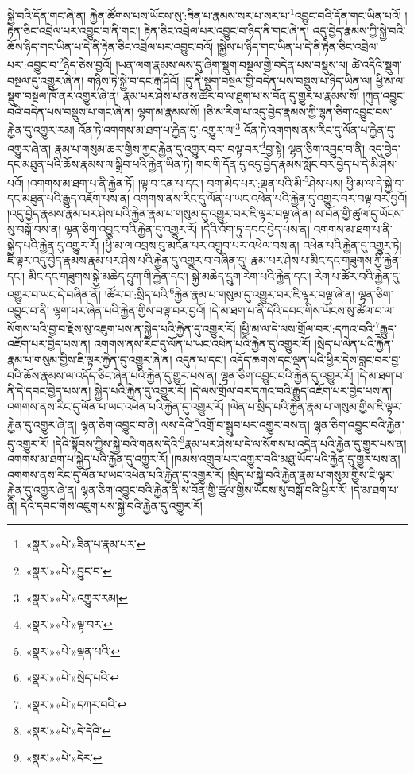 སྐྱེ་བའི་དོན་གང་ཞེ་ན། རྐྱེན་ཚོགས་པས་ཡོངས་སུ་:ཟིན་པ་རྣམས་སར་པ་སར་པ་\footnote{«སྣར་»«པེ་»ཟིན་པ་རྣམ་པར་}འབྱུང་བའི་དོན་གང་ཡིན་པའོ། །རྟེན་ཅིང་འབྲེལ་པར་འབྱུང་བ་ནི་གང་། རྟེན་ཅིང་འབྲེལ་པར་འབྱུང་བ་ཉིད་ནི་གང་ཞེ་ན། འདུ་བྱེད་རྣམས་ཀྱི་སྐྱེ་བའི་ཆོས་ཉིད་གང་ཡིན་པ་དེ་ནི་རྟེན་ཅིང་འབྲེལ་པར་འབྱུང་བའོ། །སྐྱེས་པ་ཉིད་གང་ཡིན་པ་དེ་ནི་རྟེན་ཅིང་འབྲེལ་པར་:འབྱུང་བ་\footnote{«སྣར་»«པེ་»བྱུང་བ་}ཉིད་ཅེས་བྱའོ། །ཡན་ལག་རྣམས་ལས་དུ་ཞིག་སྡུག་བསྔལ་གྱི་བདེན་པས་བསྡུས་ལ། ཚེ་འདིའི་སྡུག་བསྔལ་དུ་འགྱུར་ཞེ་ན། གཉིས་ཏེ་སྐྱེ་བ་དང་རྒ་ཤིའོ། །དུ་ནི་སྡུག་བསྔལ་གྱི་བདེན་པས་བསྡུས་པ་ཉིད་ཡིན་ལ། ཕྱི་མ་ལ་སྡུག་བསྔལ་ཁོ་ནར་འགྱུར་ཞེ་ན། རྣམ་པར་ཤེས་པ་ནས་ཚོར་བ་ལ་ཐུག་པ་ས་བོན་དུ་གྱུར་པ་རྣམས་སོ། །ཀུན་འབྱུང་བའི་བདེན་པས་བསྡུས་པ་གང་ཞེ་ན། ལྷག་མ་རྣམས་སོ། །ཅི་མ་རིག་པ་འདུ་བྱེད་རྣམས་ཀྱི་ལྷན་ཅིག་འབྱུང་བས་རྐྱེན་དུ་འགྱུར་རམ། འོན་ཏེ་འགགས་མ་ཐག་པ་རྐྱེན་དུ་:འགྱུར་ལ།\footnote{«སྣར་»«པེ་»འགྱུར་རམ།} འོན་ཏེ་འགགས་ནས་རིང་དུ་ལོན་པ་རྐྱེན་དུ་འགྱུར་ཞེ་ན། རྣམ་པ་གསུམ་ཆར་གྱིས་ཀྱང་རྐྱེན་དུ་འགྱུར་བར་:བལྟ་བར་\footnote{«སྣར་»«པེ་»ལྟ་བར་}བྱ་སྟེ། ལྷན་ཅིག་འབྱུང་བ་ནི། འདུ་བྱེད་དང་མཐུན་པའི་ཆོས་རྣམས་ལ་སྒྲིབ་པའི་རྐྱེན་ཡིན་ཏེ། གང་གི་དོན་དུ་འདུ་བྱེད་རྣམས་སློང་བར་བྱེད་པ་དེ་མི་ཤེས་པའོ། །འགགས་མ་ཐག་པ་ནི་རྐྱེན་ཏོ། །ལྟ་བ་ངན་པ་དང་། བག་མེད་པར་:ལྡན་པའི་མི་\footnote{«སྣར་»«པེ་»ལྡན་པའི་}ཤེས་པས། ཕྱི་མ་ལ་དེ་སྐྱེ་བ་དང་མཐུན་པའི་རྒྱུད་འཇོག་པས་ན། འགགས་ནས་རིང་དུ་ལོན་པ་ཡང་འཕེན་པའི་རྐྱེན་དུ་འགྱུར་བར་བལྟ་བར་བྱའོ། །འདུ་བྱེད་རྣམས་རྣམ་པར་ཤེས་པའི་རྐྱེན་རྣམ་པ་གསུམ་དུ་འགྱུར་བར་ཇི་ལྟར་བལྟ་ཞེ་ན། ས་བོན་གྱི་ཚུལ་དུ་ཡོངས་སུ་བསྒོ་བས་ན། ལྷན་ཅིག་འབྱུང་བའི་རྐྱེན་དུ་འགྱུར་རོ། །དེའི་འོག་ཏུ་དབང་བྱེད་པས་ན། འགགས་མ་ཐག་པ་ནི་སྐྱེད་པའི་རྐྱེན་དུ་འགྱུར་རོ། །ཕྱི་མ་ལ་འབྲས་བུ་མངོན་པར་འགྲུབ་པར་འཕེལ་བས་ན། འཕེན་པའི་རྐྱེན་དུ་འགྱུར་ཏེ། ཇི་ལྟར་འདུ་བྱེད་རྣམས་རྣམ་པར་ཤེས་པའི་རྐྱེན་དུ་འགྱུར་བ་བཞིན་དུ། རྣམ་པར་ཤེས་པ་མིང་དང་གཟུགས་ཀྱི་རྐྱེན་དང་། མིང་དང་གཟུགས་སྐྱེ་མཆེད་དྲུག་གི་རྐྱེན་དང་། སྐྱེ་མཆེད་དྲུག་རེག་པའི་རྐྱེན་དང་། རེག་པ་ཚོར་བའི་རྐྱེན་དུ་འགྱུར་བ་ཡང་དེ་བཞིན་ནོ། །ཚོར་བ་:སྲིད་པའི་\footnote{«སྣར་»«པེ་»སྲེད་པའི་}རྐྱེན་རྣམ་པ་གསུམ་དུ་འགྱུར་བར་ཇི་ལྟར་བལྟ་ཞེ་ན། ལྷན་ཅིག་འབྱུང་བ་ནི། ལྷག་པར་ཞེན་པའི་རྐྱེན་གྱིས་བལྟ་བར་བྱའོ། །དེ་མ་ཐག་པ་ནི་དེའི་དབང་གིས་ཡོངས་སུ་ཚོལ་བ་ལ་སོགས་པའི་བྱ་བ་རྗེས་སུ་འཇུག་པས་ན་སྐྱེད་པའི་རྐྱེན་དུ་འགྱུར་རོ། །ཕྱི་མ་ལ་དེ་ལས་གྲོལ་བར་:དཀའ་བའི་\footnote{«སྣར་»«པེ་»དཀར་བའི་}རྒྱུད་འཇོག་པར་བྱེད་པས་ན། འགགས་ནས་རིང་དུ་ལོན་པ་ཡང་འཕེན་པའི་རྐྱེན་དུ་འགྱུར་རོ། །སྲེད་པ་ལེན་པའི་རྐྱེན་རྣམ་པ་གསུམ་གྱིས་ཇི་ལྟར་རྐྱེན་དུ་འགྱུར་ཞེ་ན། འདུན་པ་དང་། འདོད་ཆགས་དང་ལྡན་པའི་ཕྱིར་དེས་བླང་བར་བྱ་བའི་ཆོས་རྣམས་ལ་འདོད་ཅིང་ཞེན་པའི་རྐྱེན་དུ་གྱུར་པས་ན། ལྷན་ཅིག་འབྱུང་བའི་རྐྱེན་དུ་འགྱུར་རོ། །དེ་མ་ཐག་པ་ནི་དེ་དབང་བྱེད་པས་ན། སྐྱེད་པའི་རྐྱེན་དུ་འགྱུར་རོ། །དེ་ལས་གྲོལ་བར་དཀའ་བའི་རྒྱུད་འཇོག་པར་བྱེད་པས་ན། འགགས་ནས་རིང་དུ་ལོན་པ་ཡང་འཕེན་པའི་རྐྱེན་དུ་འགྱུར་རོ། །ལེན་པ་སྲིད་པའི་རྐྱེན་རྣམ་པ་གསུམ་གྱིས་ཇི་ལྟར་རྐྱེན་དུ་འགྱུར་ཞེ་ན། ལྷན་ཅིག་འབྱུང་བ་ནི། ལས་དེའི་\footnote{«སྣར་»«པེ་»དེ་དེའི་}འགྲོ་བ་སྒྲུབ་པར་འགྱུར་བས་ན། ལྷན་ཅིག་འབྱུང་བའི་རྐྱེན་དུ་འགྱུར་རོ། །དེའི་སྟོབས་ཀྱིས་སྐྱེ་བའི་གནས་དེའི་\footnote{«སྣར་»«པེ་»དེར་}རྣམ་པར་ཤེས་པ་དེ་ལ་སོགས་པ་འདྲེན་པའི་རྐྱེན་དུ་གྱུར་པས་ན། འགགས་མ་ཐག་པ་སྐྱེད་པའི་རྐྱེན་དུ་འགྱུར་རོ། །ཁམས་འགྲུབ་པར་འགྱུར་བའི་མཐུ་ཡོད་པའི་རྐྱེན་དུ་གྱུར་པས་ན། འགགས་ནས་རིང་དུ་ལོན་པ་ཡང་འཕེན་པའི་རྐྱེན་དུ་འགྱུར་རོ། །སྲིད་པ་སྐྱེ་བའི་རྐྱེན་རྣམ་པ་གསུམ་གྱིས་ཇི་ལྟར་རྐྱེན་དུ་འགྱུར་ཞེ་ན། ལྷན་ཅིག་འབྱུང་བའི་རྐྱེན་ནི་ས་བོན་གྱི་ཚུལ་གྱིས་ཡོངས་སུ་བསྒོ་བའི་ཕྱིར་རོ། །དེ་མ་ཐག་པ་ནི། དེའི་དབང་གིས་འཇུག་པས་སྐྱེ་བའི་རྐྱེན་དུ་འགྱུར་རོ། 